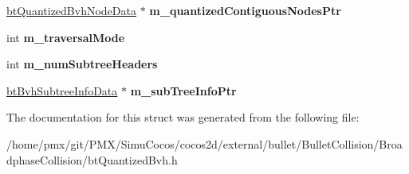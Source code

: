 \begin{DoxyCompactItemize}
\hyperlink{structbtQuantizedBvhNodeData}{bt\+Quantized\+Bvh\+Node\+Data} $\ast$ {\bfseries m\+\_\+quantized\+Contiguous\+Nodes\+Ptr}
\item 
\mbox{\label{structbtQuantizedBvhDoubleData_a42c77f3965294fa766714eba6bb52c41}} 
int {\bfseries m\+\_\+traversal\+Mode}
\item 
\mbox{\label{structbtQuantizedBvhDoubleData_a1a942c5875b6979fc4b0aced16546e15}} 
int {\bfseries m\+\_\+num\+Subtree\+Headers}
\item 
\mbox{\label{structbtQuantizedBvhDoubleData_ab9c25cb352389444fc085f709de1c785}} 
\hyperlink{structbtBvhSubtreeInfoData}{bt\+Bvh\+Subtree\+Info\+Data} $\ast$ {\bfseries m\+\_\+sub\+Tree\+Info\+Ptr}
\end{DoxyCompactItemize}


The documentation for this struct was generated from the following file\+:\begin{DoxyCompactItemize}
\item 
/home/pmx/git/\+P\+M\+X/\+Simu\+Cocos/cocos2d/external/bullet/\+Bullet\+Collision/\+Broadphase\+Collision/bt\+Quantized\+Bvh.\+h\end{DoxyCompactItemize}
